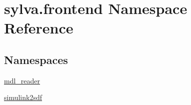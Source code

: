 \hypertarget{namespacesylva_1_1frontend}{}\section{sylva.\+frontend Namespace Reference}
\label{namespacesylva_1_1frontend}
\subsection*{Namespaces}
\begin{DoxyCompactItemize}
\item 
 \hyperlink{namespacesylva_1_1frontend_1_1mdl__reader}{mdl\+\_\+reader}
\item 
 \hyperlink{namespacesylva_1_1frontend_1_1simulink2sdf}{simulink2sdf}
\end{DoxyCompactItemize}
